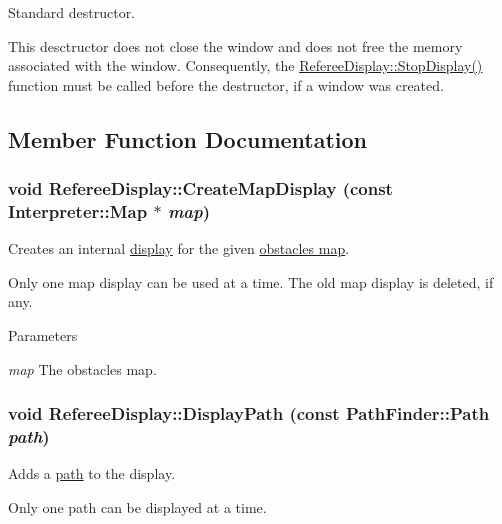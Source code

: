 Standard destructor. 

This desctructor does not close the window and does not free the memory associated with the window. Consequently, the \hyperlink{classRefereeDisplay_aafa710132ce88c4e6cb4d430baf26173}{RefereeDisplay::StopDisplay()} function must be called before the destructor, if a window was created. 

\subsection{Member Function Documentation}
\hypertarget{classRefereeDisplay_a9c18f26c62f9507f903ec9b29c1bfea8}{
\subsubsection[{CreateMapDisplay}]{\setlength{\rightskip}{0pt plus 5cm}void RefereeDisplay::CreateMapDisplay (const {\bf Interpreter::Map} $\ast$ {\em map})}}
\label{classRefereeDisplay_a9c18f26c62f9507f903ec9b29c1bfea8}


Creates an internal \hyperlink{classMapDisplay}{display} for the given \hyperlink{classInterpreter_a4c080f069f557cf92dfe803117a6ea53}{obstacles map}. 

Only one map display can be used at a time. The old map display is deleted, if any.


\begin{DoxyParams}{Parameters}
\item[{\em map}]The obstacles map. \end{DoxyParams}
\hypertarget{classRefereeDisplay_ad7f07077e92fd46956bf1aa25715e414}{
\subsubsection[{DisplayPath}]{\setlength{\rightskip}{0pt plus 5cm}void RefereeDisplay::DisplayPath (const {\bf PathFinder::Path} {\em path})}}
\label{classRefereeDisplay_ad7f07077e92fd46956bf1aa25715e414}


Adds a \hyperlink{classPathFinder_a269aba09b7b3208092f67f2bc02cf63e}{path} to the display. 

Only one path can be displayed at a time.


